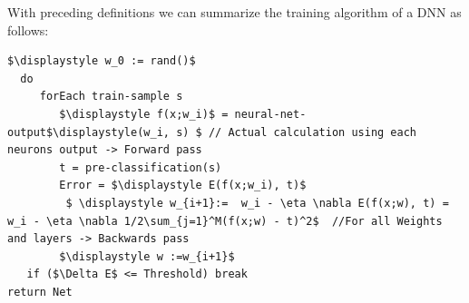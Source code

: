 With preceding definitions we can summarize the training algorithm of a DNN as follows:
\begin{lstlisting}[label=lst:pseudo:train,caption=Pseudo Code to show the Backpropagation/SGD algorithm in Action,mathescape]
 $\displaystyle w_0 := rand()$
  do
     forEach train-sample s
        $\displaystyle f(x;w_i)$ = neural-net-output$\displaystyle(w_i, s) $ // Actual calculation using each neurons output -> Forward pass
        t = pre-classification(s)
        Error = $\displaystyle E(f(x;w_i), t)$
         $ \displaystyle w_{i+1}:=  w_i - \eta \nabla E(f(x;w), t) = w_i - \eta \nabla 1/2\sum_{j=1}^M(f(x;w) - t)^2$  //For all Weights and layers -> Backwards pass
        $\displaystyle w :=w_{i+1}$
   if ($\Delta E$ <= Threshold) break
return Net
\end{lstlisting}
